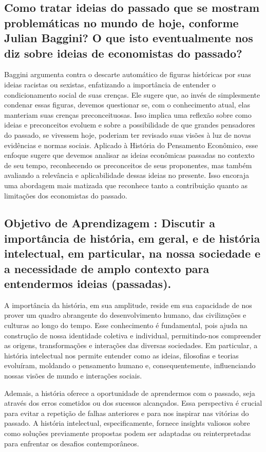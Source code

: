 \documentclass[12pt]{article}
\begin{document}
\subsection{\textbf{Como tratar ideias do passado que se mostram problemáticas no mundo de hoje,
conforme Julian Baggini? O que isto eventualmente nos diz sobre ideias de economistas
do passado?}}
 Baggini argumenta contra o descarte automático de figuras históricas por suas ideias racistas ou sexistas, enfatizando a importância de entender o condicionamento social de suas crenças. Ele sugere que, ao invés de simplesmente condenar essas figuras, devemos questionar se, com o conhecimento atual, elas manteriam suas crenças preconceituosas. Isso implica uma reflexão sobre como ideias e preconceitos evoluem e sobre a possibilidade de que grandes pensadores do passado, se vivessem hoje, poderiam ter revisado suas visões à luz de novas evidências e normas sociais. Aplicado à História do Pensamento Econômico, esse enfoque sugere que devemos analisar as ideias econômicas passadas no contexto de seu tempo, reconhecendo os preconceitos de seus proponentes, mas também avaliando a relevância e aplicabilidade dessas ideias no presente. Isso encoraja uma abordagem mais matizada que reconhece tanto a contribuição quanto as limitações dos economistas do passado.

\subsection{\textbf{Objetivo de Aprendizagem : Discutir a importância de história, em geral, e de história intelectual, em particular, na nossa sociedade e a necessidade de amplo contexto para entendermos ideias (passadas).}}
A importância da história, em sua amplitude, reside em sua capacidade de nos prover um quadro abrangente do desenvolvimento humano, das civilizações e culturas ao longo do tempo. Esse conhecimento é fundamental, pois ajuda na construção de nossa identidade coletiva e individual, permitindo-nos compreender as origens, transformações e interações das diversas sociedades. Em particular, a história intelectual nos permite entender como as ideias, filosofias e teorias evoluíram, moldando o pensamento humano e, consequentemente, influenciando nossas visões de mundo e interações sociais.

Ademais, a história oferece a oportunidade de aprendermos com o passado, seja através dos erros cometidos ou dos sucessos alcançados. Essa perspectiva é crucial para evitar a repetição de falhas anteriores e para nos inspirar nas vitórias do passado. A história intelectual, especificamente, fornece insights valiosos sobre como soluções previamente propostas podem ser adaptadas ou reinterpretadas para enfrentar os desafios contemporâneos.
\end{document}
